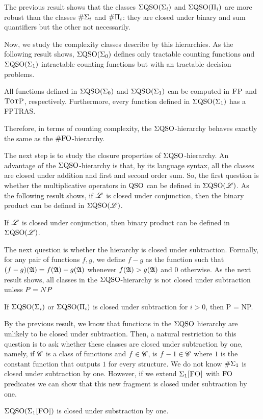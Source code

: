 
The previous result shows that the classes $\Sigma{\rm QSO}(\Sigma_{i})$ and $\Sigma{\rm QSO}(\Pi_{i})$ are more robust than the classes $\#\Sigma_{i}$ and $\#\Pi_{i}$: they are closed under binary and sum quantifiers but the other not necessarily. 

Now, we study the complexity classes describe by this hierarchies. As the following result shows, $\Sigma{\rm QSO}(\Sigma_{0})$ defines only tractable counting functions and $\Sigma{\rm QSO}(\Sigma_{1})$ intractable counting functions but with an tractable decision problems. 
\begin{proposition} \label{prop:qe0-fp-qe1-totp-fptras}
All functions defined in $\Sigma{\rm QSO}(\Sigma_{0})$ and $\Sigma{\rm QSO}(\Sigma_{1})$ can be computed in $\text{\sc FP}$ and $\text{\sc TotP}$, respectively. Furthermore, every function defined in $\Sigma{\rm QSO}(\Sigma_{1})$ has a FPTRAS.
\end{proposition}
Therefore, in terms of counting complexity, the $\Sigma{\rm QSO}$-hierarchy behaves exactly the same as the $\#{\rm FO}$-hierarchy.

The next step is to study the closure properties of $\Sigma{\rm QSO}$-hierarchy. 
An advantage of the $\Sigma{\rm QSO}$-hierarchy is that, by its language syntax, all the classes are closed under addition and first and second order sum.
So, the first question is whether the multiplicative operators in ${\rm QSO}$ can be defined in $\Sigma{\rm QSO}(\mathscr{L})$. As the following result shows, if $\mathscr{L}$ is closed under conjunction, then the binary product can be defined in  $\Sigma{\rm QSO}(\mathscr{L})$.
\begin{theorem}\label{theo:binary-prod}
	If $\mathscr{L}$ is closed under conjunction, then binary product can be defined in $\Sigma{\rm QSO}(\mathscr{L})$.
\end{theorem}
The next question is whether the hierarchy is closed under subtraction. Formally, for any pair of functions $f,g$, we define $f - g$ as the function such that $(f - g)(\mathfrak{A}) = f(\mathfrak{A})-g(\mathfrak{A})$ whenever $f(\mathfrak{A})>g(\mathfrak{A})$ and $0$ otherwise.
As the next result shows, all classes in the $\Sigma{\rm QSO}$-hierarchy is not closed under subtraction unless ${\sc P} = {\sc NP}$
\begin{theorem} \label{sub-pnp}
If $\Sigma{\rm QSO}(\Sigma_{i})$ or $\Sigma{\rm QSO}(\Pi_{i})$ is closed under subtraction for $i > 0$, then {\sc P} = {\sc NP}.
\end{theorem}

By the previous result, we know that functions in the $\Sigma{\rm QSO}$ hierarchy are unlikely to be closed under subtraction. Then, a natural restriction to this question is to ask whether these classes are closed under subtraction by one, namely, if $\mathscr{C}$ is a class of functions and $f \in \mathscr{C}$, is $f-1 \in \mathscr{C}$ where $1$ is the constant function that outputs $1$ for every structure. 
We do not know $\#\Sigma_{1}$ is closed under subtraction by one. However, if we extend $\Sigma_{1}\textsc{[FO]}$ with ${\rm FO}$ predicates we can show that this new fragment is closed under subtraction by one.
\begin{theorem} \label{sigmafo-minusone}
	$\Sigma{\rm QSO}(\Sigma_{1}\textsc{[FO]})$ is closed under substraction by one.
\end{theorem}

